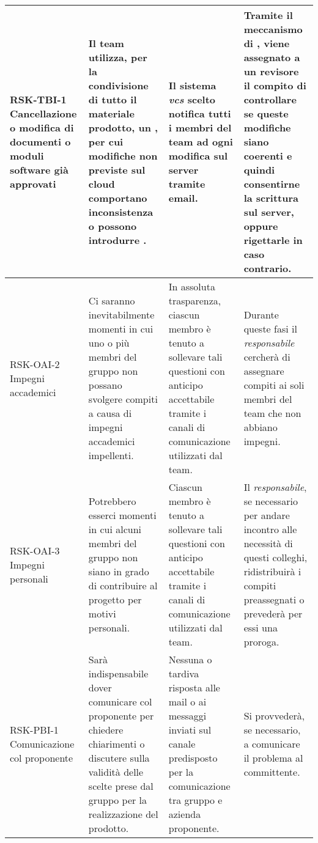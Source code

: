 \begin{center}
\begin{longtable}{|p{3cm}|p{4cm}|p{3.5cm}|p{3.5cm}|}
		\hline
	RSK-TBI-1 \newline Cancellazione o modifica di documenti o moduli software già approvati & 
	Il team utilizza, per la condivisione di tutto il materiale prodotto, un \glock{vcs}, per cui modifiche non previste sul cloud comportano inconsistenza o possono introdurre \glock{regressioni}.
	&  Il sistema \textit{vcs} scelto notifica tutti i membri del team ad ogni modifica sul server tramite email.   
	 
	& Tramite il meccanismo di \glock{pull request}, viene assegnato a un revisore il compito di controllare se queste modifiche siano coerenti e quindi consentirne la scrittura sul server, oppure rigettarle in caso contrario.   \\
	\hline
	
		\hline
	RSK-OAI-2 \newline Impegni accademici & 
	Ci saranno inevitabilmente momenti in cui uno o più membri del gruppo non possano svolgere compiti a causa di impegni accademici impellenti.
	&  In assoluta trasparenza, ciascun membro è tenuto a sollevare tali questioni con anticipo accettabile tramite i canali di comunicazione utilizzati dal team.
	 
	& Durante queste fasi il \textit{responsabile} cercherà di assegnare compiti ai soli membri del team che non abbiano impegni. \\
	\hline
	
		\hline
	RSK-OAI-3 \newline Impegni personali & 
	Potrebbero esserci momenti in cui alcuni membri del gruppo non siano in grado di contribuire al progetto per motivi personali.
	&  Ciascun membro è tenuto a sollevare tali questioni con anticipo accettabile tramite i canali di comunicazione utilizzati dal team.
	 
	& Il \textit{responsabile}, se necessario per andare incontro alle necessità di questi colleghi, ridistribuirà i compiti preassegnati o prevederà per essi una proroga. \\
	\hline
	
		\hline
	RSK-PBI-1 \newline Comunicazione col proponente
	 & 
	Sarà indispensabile dover comunicare col proponente per chiedere chiarimenti o discutere sulla validità delle scelte prese dal gruppo per la realizzazione del prodotto.
	&  Nessuna o tardiva risposta alle mail o ai messaggi inviati sul canale \glock{slack} predisposto per la comunicazione tra gruppo e azienda proponente.
	 
	& Si provvederà, se necessario, a comunicare il problema al committente.  \\
	\hline
	

\end{longtable}
\end{center}
